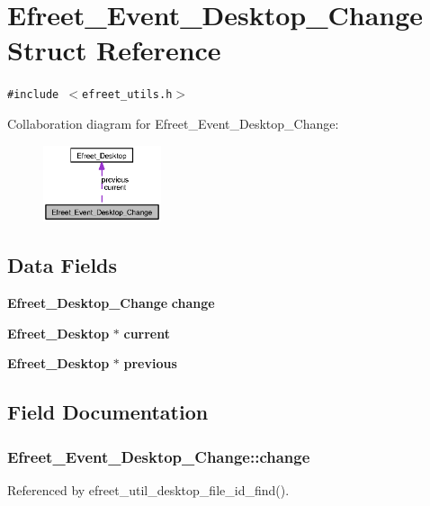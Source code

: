 \section{Efreet\_\-Event\_\-Desktop\_\-Change Struct Reference}
\label{structEfreet__Event__Desktop__Change}
{\tt \#include $<$efreet\_\-utils.h$>$}

Collaboration diagram for Efreet\_\-Event\_\-Desktop\_\-Change:\nopagebreak
\begin{figure}[H]
\begin{center}
\leavevmode
\includegraphics[width=98pt]{structEfreet__Event__Desktop__Change__coll__graph}
\end{center}
\end{figure}
\subsection*{Data Fields}
\begin{CompactItemize}
\item 
{\bf Efreet\_\-Desktop\_\-Change} {\bf change}
\item 
{\bf Efreet\_\-Desktop} $\ast$ {\bf current}
\item 
{\bf Efreet\_\-Desktop} $\ast$ {\bf previous}
\end{CompactItemize}


\subsection{Field Documentation}
\subsubsection{ {\bf Efreet\_\-Event\_\-Desktop\_\-Change::change}}\label{structEfreet__Event__Desktop__Change_67a21053f25151f4ecd071f44e75fc8d}




Referenced by efreet\_\-util\_\-desktop\_\-file\_\-id\_\-find().
